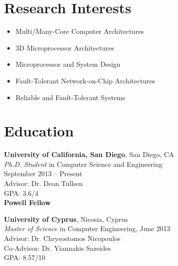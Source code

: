 \documentclass[11pt]{myres} %
\begin{document}
 
\onehalfspacing


\address{
		  \emph{One Miramar Street 929456} \\ 
		  \emph{La Jolla, 92092}   \\ 
		  \emph{San Diego, California}}
		  
\address{
		  \href{mailto:prodromou.andreas@gmail.com} 								   {\underline{prodromou.andreas@gmail.com}} \\  
		  \emph{tel: (858) 263-5813}}
             
                             
\begin{resume}
                                
\singlespacing

\section{Research Interests}
	\begin{itemize}
		\item Multi/Many-Core Computer Architectures
		\item 3D Microprocessor Architectures
		\item Microprocessor and System Design
		\item Fault-Tolerant Network-on-Chip Architectures
		\item Reliable and Fault-Tolerant Systems
	\end{itemize}
 
\section{Education} 
\noindent 
	{\color{blue}\textbf{University of California, San Diego}, San Diego, CA} \\
	\emph{Ph.D. Student} in Computer Science and Engineering \\
	September 2013 -- Present \\
	Advisor: Dr. Dean Tullsen \\
	GPA: 3.6/4 \\
	\textbf{Powell Fellow}

	{\color{blue}\textbf{University of Cyprus}, Nicosia, Cyprus} \\
	\emph{Master of Science} in Computer Engineering, June 2013 \\
	Advisor: Dr. Chrysostomos Nicopoulos \\
	Co-Advisor: Dr. Yiannakis Sazeides \\
	GPA: 8.57/10
	

\end{resume}
\end{document}
